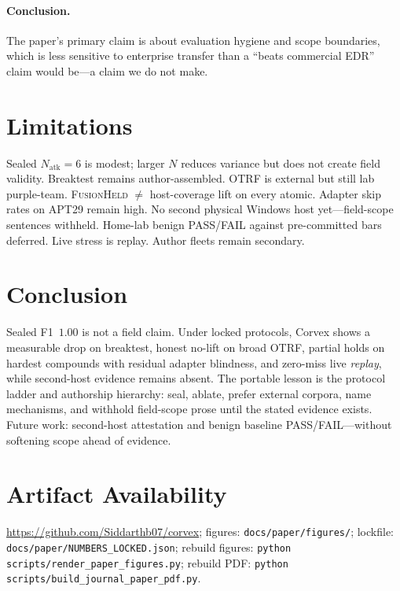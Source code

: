 \documentclass[conference,compsoc]{IEEEtran}
\begin{document}
\paragraph{Conclusion.}
The paper's primary claim is about evaluation hygiene and scope boundaries,
which is less sensitive to enterprise transfer than a ``beats commercial EDR''
claim would be---a claim we do not make.

\section{Limitations}
\label{sec:limits}

Sealed $N_{\mathrm{atk}}{=}6$ is modest; larger $N$ reduces variance but does
not create field validity.
Breaktest remains author-assembled.
OTRF is external but still lab purple-team.
\textsc{FusionHeld} $\neq$ host-coverage lift on every atomic.
Adapter skip rates on APT29 remain high.
No second physical Windows host yet---field-scope sentences withheld.
Home-lab benign PASS/FAIL against pre-committed bars deferred.
Live stress is replay.
Author fleets remain secondary.

\section{Conclusion}
\label{sec:conclusion}

Sealed F1~$1.00$ is not a field claim.
Under locked protocols, Corvex shows a measurable drop on breaktest, honest
no-lift on broad OTRF, partial holds on hardest compounds with residual adapter
blindness, and zero-miss live \emph{replay}, while second-host evidence remains
absent.
The portable lesson is the protocol ladder and authorship hierarchy: seal,
ablate, prefer external corpora, name mechanisms, and withhold field-scope
prose until the stated evidence exists.
Future work: second-host attestation and benign baseline PASS/FAIL---without
softening scope ahead of evidence.

\section*{Artifact Availability}
\url{https://github.com/Siddarthb07/corvex}; figures:
\texttt{docs/paper/figures/}; lockfile:
\texttt{docs/paper/NUMBERS\_LOCKED.json}; rebuild figures:
\texttt{python scripts/render\_paper\_figures.py}; rebuild PDF:
\texttt{python scripts/build\_journal\_paper\_pdf.py}.
\end{document}
